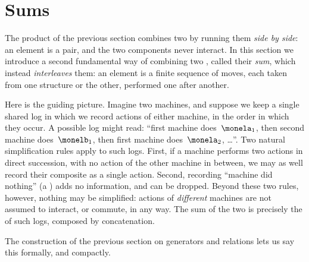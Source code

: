 
\section{Sums}
\label{sec:sums-algebra}



The product of the previous section combines two  by running them \emph{side by side}: an element is a pair, and the two components never interact.
In this section we introduce a second fundamental way of combining two , called their \emph{sum}, which instead \emph{interleaves} them: an element is a finite sequence of moves, each taken from one structure or the other, performed one after another.

Here is the guiding picture.
Imagine two machines, and suppose we keep a single shared log in which we record actions of either machine, in the order in which they occur.
A possible log might read: ``first machine does~$\monela_1$, then second machine does~$\monelb_1$, then first machine does~$\monela_2$, \dots''.
Two natural simplification rules apply to such logs.
First, if a machine performs two actions in direct succession, with no action of the other machine in between, we may as well record their composite as a single action.
Second, recording ``machine did nothing'' (a ) adds no information, and can be dropped.
Beyond these two rules, however, nothing may be simplified: actions of \emph{different} machines are not assumed to interact, or commute, in any way.
The sum of the two  is precisely the  of such logs, composed by concatenation.

The construction of the previous section on generators and relations lets us say this formally, and compactly.

